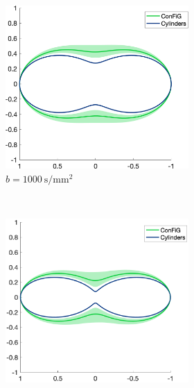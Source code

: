 \begin{figure}
  \begin{subfigure}[]{\textwidth}
  \begin{subfigure}[]{0.3\textwidth}
    \includegraphics[width=\textwidth]{figures/frf_experiment/EMfibres_prctiles_b_1000}
    \caption*{$b=\SI{1000}{\second\per\milli\metre\squared}$}
  \end{subfigure}
  ~
  \begin{subfigure}[]{0.3\textwidth}
    \includegraphics[width=\textwidth]{figures/frf_experiment/EMfibres_prctiles_b_2000}

\end{subfigure}
\end{subfigure}
\end{figure}
